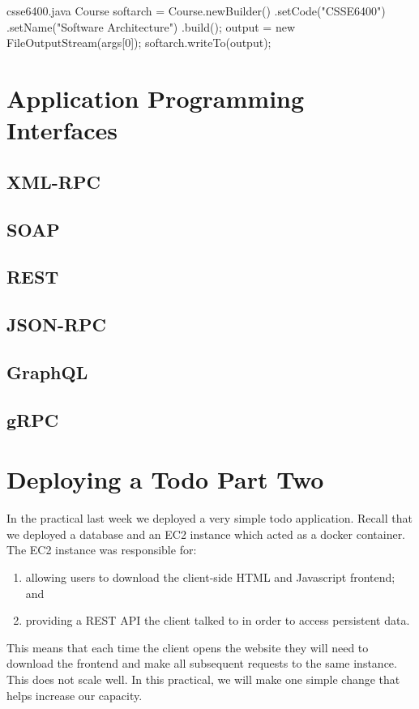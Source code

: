 \documentclass{csse4400}
\begin{document}
\begin{code}[language=java]{csse6400.java}
Course softarch = Course.newBuilder()
    .setCode("CSSE6400")
    .setName("Software Architecture")
    .build();
output = new FileOutputStream(args[0]);
softarch.writeTo(output);
\end{code}

\section{Application Programming Interfaces}
\subsection{XML-RPC}
\subsection{SOAP}
\subsection{REST}
\subsection{JSON-RPC}
\subsection{GraphQL}
\subsection{gRPC}

\section{Deploying a Todo Part Two}

In the practical last week we deployed a very simple todo application.
Recall that we deployed a database and an EC2 instance which acted as a docker container.
The EC2 instance was responsible for:
\begin{enumerate}
  \item allowing users to download the client-side HTML and Javascript frontend; and
  \item providing a REST API the client talked to in order to access persistent data.
\end{enumerate}
This means that each time the client opens the website they will need to download the frontend and make all subsequent requests to the same instance.
This does not scale well.
In this practical, we will make one simple change that helps increase our capacity.
\end{document}
